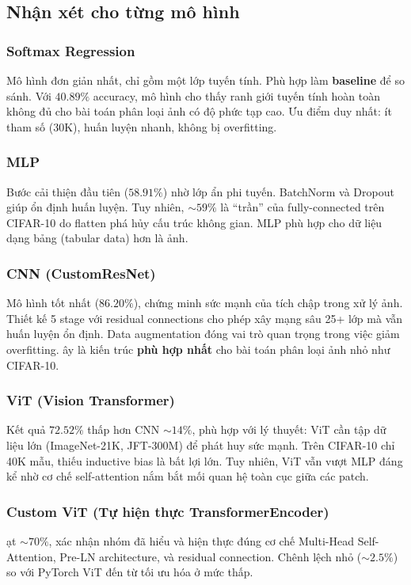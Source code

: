 \documentclass[a4paper]{article}
\theoremstyle{definition}
\begin{document}
\subsection{Nhận xét cho từng mô hình}

\subsubsection{Softmax Regression}
Mô hình đơn giản nhất, chỉ gồm một lớp tuyến tính. Phù hợp làm \textbf{baseline} để so sánh. Với $40.89\%$ accuracy, mô hình cho thấy ranh giới tuyến tính hoàn toàn không đủ cho bài toán phân loại ảnh có độ phức tạp cao. Ưu điểm duy nhất: ít tham số (30K), huấn luyện nhanh, không bị overfitting.

\subsubsection{MLP}
Bước cải thiện đầu tiên ($58.91\%$) nhờ lớp ẩn phi tuyến. BatchNorm và Dropout giúp ổn định huấn luyện. Tuy nhiên, $\sim 59\%$ là ``trần'' của fully-connected trên CIFAR-10 do flatten phá hủy cấu trúc không gian. MLP phù hợp cho dữ liệu dạng bảng (tabular data) hơn là ảnh.

\subsubsection{CNN (CustomResNet)}
Mô hình tốt nhất ($86.20\%$), chứng minh sức mạnh của tích chập trong xử lý ảnh. Thiết kế 5 stage với residual connections cho phép xây mạng sâu 25+ lớp mà vẫn huấn luyện ổn định. Data augmentation đóng vai trò quan trọng trong việc giảm overfitting. \DJ ây là kiến trúc \textbf{phù hợp nhất} cho bài toán phân loại ảnh nhỏ như CIFAR-10.

\subsubsection{ViT (Vision Transformer)}
Kết quả $72.52\%$ thấp hơn CNN $\sim 14\%$, phù hợp với lý thuyết: ViT cần tập dữ liệu lớn (ImageNet-21K, JFT-300M) để phát huy sức mạnh. Trên CIFAR-10 chỉ 40K mẫu, thiếu inductive bias là bất lợi lớn. Tuy nhiên, ViT vẫn vượt MLP đáng kể nhờ cơ chế self-attention nắm bắt mối quan hệ toàn cục giữa các patch.

\subsubsection{Custom ViT (Tự hiện thực TransformerEncoder)}
\DJ ạt $\sim 70\%$, xác nhận nhóm đã hiểu và hiện thực đúng cơ chế Multi-Head Self-Attention, Pre-LN architecture, và residual connection. Chênh lệch nhỏ ($\sim 2.5\%$) so với PyTorch ViT đến từ tối ưu hóa ở mức thấp.
\end{document}

